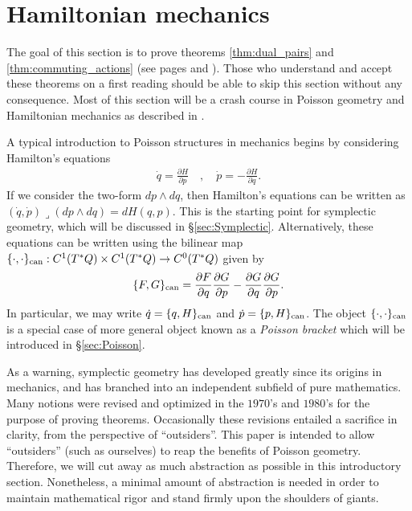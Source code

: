 \documentclass[12pt]{amsart}
\newcommand{\pder}[2]{\ensuremath{\frac{\partial #1}{\partial #2}}}
\begin{document}
\appendix

\section{Hamiltonian mechanics}
\label{sec:Hamiltonian}
The goal of this section is to prove theorems \ref{thm:dual_pairs}
and \ref{thm:commuting_actions} (see pages \pageref{thm:dual_pairs} and \pageref{thm:commuting_actions}).
Those who understand and accept these theorems on a first reading
should be able to skip this section without any consequence.
Most of this section will be a crash course in Poisson geometry
and Hamiltonian mechanics as described in \cite{FOM,MandS,Weinstein1983}.

A typical introduction to Poisson structures in mechanics
begins by considering Hamilton's equations
\begin{align*}
  \dot{q} = \pder{H}{p} \quad, \quad  \dot{p} = - \pder{H}{q}.
\end{align*}
If we consider the two-form $dp \wedge dq$, then Hamilton's equations
can be written as $(\dot{q},\dot{p}) \lrcorner (dp \wedge dq) = dH(q,p)$.
This is the starting point for symplectic geometry, which
will be discussed in \S \ref{sec:Symplectic}.
Alternatively, these equations can be written using the bilinear map $\{ \cdot , \cdot \}_{\rm can} : C^1( T^*Q) \times C^1(T^*Q) \to C^0(T^*Q)$
given by
\begin{align*}
  \{ F , G \}_{\rm can} = \pder{F}{q}\pder{G}{p} - \pder{G}{q} \pder{G}{p}.
\end{align*}
In particular, we may write $\dot{q} = \{ q , H \}_{\rm can}$ and $\dot{p} = \{ p , H\}_{\rm can}$.
The object $\{ \cdot , \cdot \}_{\rm can}$ is a special case of more general
object known as a \emph{Poisson bracket} which will be introduced in
\S \ref{sec:Poisson}.

As a warning, symplectic geometry has developed greatly
since its origins in mechanics, and
has branched into an independent subfield of pure mathematics.
Many notions were revised and optimized in the $1970$'s and $1980$'s for
the purpose of proving theorems.
Occasionally these revisions entailed a sacrifice
in clarity, from the perspective of ``outsiders''.
This paper is intended to allow ``outsiders''
(such as ourselves) to reap the benefits of Poisson geometry.
Therefore, we will cut away as much abstraction as possible in this introductory
section.
Nonetheless, a minimal amount of abstraction is needed in order to
maintain mathematical rigor and stand firmly upon the shoulders of giants.
\end{document}
